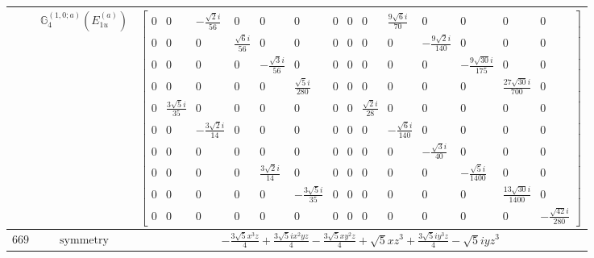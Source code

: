 \documentclass[fleqn,8pt,landscape]{jsarticle}
\begin{document}
\begin{longtable}{ccc}
$  $ & $ \mathbb{G}_{4}^{(1,0;a)}(E_{1u}^{(a)}) $ & $ \begin{bmatrix} 0 & 0 & - \frac{\sqrt{2} i}{56} & 0 & 0 & 0 & 0 & 0 & 0 & \frac{9 \sqrt{6} i}{70} & 0 & 0 & 0 & 0 \\ 0 & 0 & 0 & \frac{\sqrt{6} i}{56} & 0 & 0 & 0 & 0 & 0 & 0 & - \frac{9 \sqrt{2} i}{140} & 0 & 0 & 0 \\ 0 & 0 & 0 & 0 & - \frac{\sqrt{3} i}{56} & 0 & 0 & 0 & 0 & 0 & 0 & - \frac{9 \sqrt{30} i}{175} & 0 & 0 \\ 0 & 0 & 0 & 0 & 0 & \frac{\sqrt{5} i}{280} & 0 & 0 & 0 & 0 & 0 & 0 & \frac{27 \sqrt{30} i}{700} & 0 \\ 0 & \frac{3 \sqrt{5} i}{35} & 0 & 0 & 0 & 0 & 0 & 0 & \frac{\sqrt{2} i}{28} & 0 & 0 & 0 & 0 & 0 \\ 0 & 0 & - \frac{3 \sqrt{2} i}{14} & 0 & 0 & 0 & 0 & 0 & 0 & - \frac{\sqrt{6} i}{140} & 0 & 0 & 0 & 0 \\ 0 & 0 & 0 & 0 & 0 & 0 & 0 & 0 & 0 & 0 & - \frac{\sqrt{3} i}{40} & 0 & 0 & 0 \\ 0 & 0 & 0 & 0 & \frac{3 \sqrt{2} i}{14} & 0 & 0 & 0 & 0 & 0 & 0 & - \frac{\sqrt{5} i}{1400} & 0 & 0 \\ 0 & 0 & 0 & 0 & 0 & - \frac{3 \sqrt{5} i}{35} & 0 & 0 & 0 & 0 & 0 & 0 & \frac{13 \sqrt{30} i}{1400} & 0 \\ 0 & 0 & 0 & 0 & 0 & 0 & 0 & 0 & 0 & 0 & 0 & 0 & 0 & - \frac{\sqrt{42} i}{280} \end{bmatrix} $ \\ \hline
$ 669 $ & $ \text{symmetry} $ & $ - \frac{3 \sqrt{5} x^{3} z}{4} + \frac{3 \sqrt{5} i x^{2} y z}{4} - \frac{3 \sqrt{5} x y^{2} z}{4} + \sqrt{5} x z^{3} + \frac{3 \sqrt{5} i y^{3} z}{4} - \sqrt{5} i y z^{3} $ \\

\end{longtable}
\end{document}
